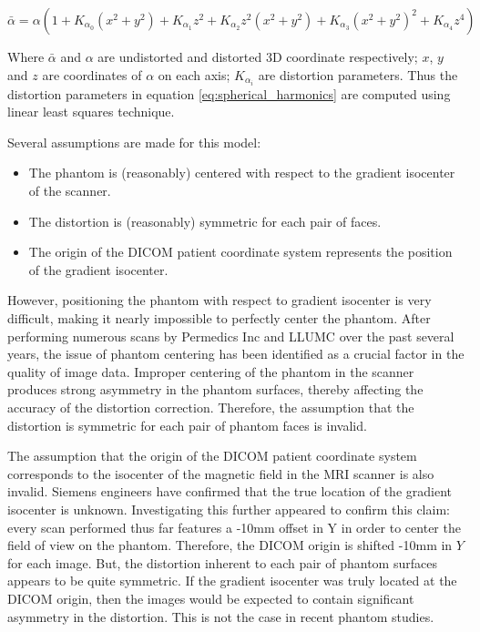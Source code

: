 \documentclass{sbthesis}
\begin{document}
\begin{equation} \label{eq:spherical_harmonics}
\bar{\alpha} = \alpha(1 + K_{\alpha_0}(x^2 + y^2) + K_{\alpha_1}z^2 +
K_{\alpha_2}z^2(x^2 + y^2) + K_{\alpha_3}(x^2 + y^2)^2 +
K_{\alpha_4}z^4)
\end{equation}

Where $\bar{\alpha}$ and $\alpha$ are undistorted and distorted 3D coordinate respectively; $x$, $y$ and $z$ are coordinates of $\alpha$ on each axis; $K_{\alpha_i}$ are distortion parameters. Thus the distortion parameters in
equation \ref{eq:spherical_harmonics} are computed using linear least squares
technique.

Several assumptions are made for this model:
\begin{itemize}
  \item The phantom is (reasonably) centered with respect to the gradient isocenter of the scanner.
  \item The distortion is (reasonably) symmetric for each pair of faces.
  \item The origin of the DICOM patient coordinate system represents the position of the gradient isocenter.
\end{itemize}

However, positioning the phantom with respect to gradient isocenter is very difficult,
making it nearly impossible to perfectly center the phantom. After performing numerous
scans by Permedics Inc and LLUMC over the past several years, the issue of phantom centering has been identified
as a crucial factor in the quality of image data.  Improper centering of the phantom
in the scanner produces strong asymmetry in the phantom surfaces, thereby affecting the
accuracy of the distortion correction.  Therefore, the assumption that the distortion
is symmetric for each pair of phantom faces is invalid.

The assumption that the origin of the DICOM patient coordinate system corresponds to the isocenter of the magnetic field in the MRI scanner is also invalid. Siemens
engineers have confirmed that the true location of the gradient isocenter is unknown.
Investigating this further appeared to confirm this claim:  every scan performed thus far features a -10mm offset in Y in order to center the field of view on the phantom.  Therefore, the DICOM origin is shifted -10mm in $Y$ for each image.  But, the distortion inherent to each pair of phantom surfaces appears to be quite symmetric.  If the gradient isocenter was truly located at the DICOM origin, then the images would be expected to contain significant asymmetry in the distortion.  This is not the case in recent phantom studies.
\end{document}
